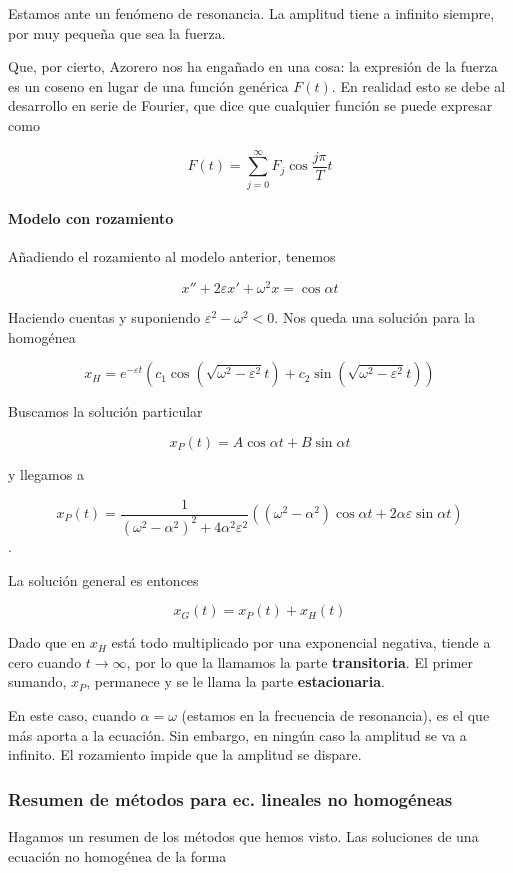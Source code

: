 Estamos ante un fenómeno de resonancia. La amplitud tiene a infinito siempre, por muy pequeña que sea la fuerza.

Que, por cierto, Azorero nos ha engañado en una cosa: la expresión de la fuerza es un coseno en lugar de una función genérica $F(t)$. En realidad esto se debe al desarrollo en serie de Fourier, que dice que cualquier función se puede expresar como

\[ F(t) = \sum_{j=0}^∞ F_j \cos \frac{jπ}{T}t \]

\paragraph{Modelo con rozamiento}

Añadiendo el rozamiento al modelo anterior, tenemos

\[ x''+2εx'+ω^2x = \cos αt \]

Haciendo cuentas y suponiendo $ε^2-ω^2<0$. Nos queda una solución para la homogénea

\[ x_H = e^{-εt}\left(c_1 \cos \left( \sqrt{ω^2-ε^2}t \right) + c_2 \sin \left( \sqrt{ω^2-ε^2}t\right)\right) \]

Buscamos la solución particular

\[ x_P (t) = A\cos αt + B\sin αt \]

y llegamos a

\[ x_P(t) = \frac{1}{(ω^2-α^2)^2 + 4α^2ε^2}\left((ω^2-α^2)\cos αt + 2αε \sin αt \right) \].

La solución general es entonces

\[ x_G(t) = x_P(t) + x_H(t) \]

Dado que en $x_H$ está todo multiplicado por una exponencial negativa, tiende a cero cuando $t\to ∞$, por lo que la llamamos la parte \textbf{transitoria}. El primer sumando, $x_P$, permanece y se le llama la parte \textbf{estacionaria}.

En este caso, cuando $α=ω$ (estamos en la frecuencia de resonancia), es el que más aporta a la ecuación. Sin embargo, en ningún caso la amplitud se va a infinito. El rozamiento impide que la amplitud se dispare.

\subsubsection{Resumen de métodos para ec. lineales no homogéneas}

Hagamos un resumen de los métodos que hemos visto. Las soluciones de una ecuación no homogénea de la forma

